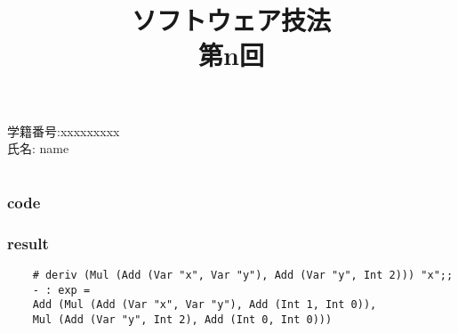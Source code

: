 

\renewcommand{\thesubsection}{\arabic{section} - (\alph{subsection})}
\renewcommand{\thesection}{課題\arabic{section}}


\lstset{language=[Objective]caml}

\makeatother
\setlength{\oddsidemargin}{-2mm}
\setlength{\evensidemargin}{-2mm}
\setlength{\topmargin}{-30mm}
\setlength{\textwidth}{164mm}
\setlength{\textheight}{250mm}

\makeatletter
\title{\rm ソフトウェア技法 \\ 第n回}
\author{}
\date{}



\maketitle

\begin{description}
	\item[\rm \large 学籍番号:xxxxxxxxx]
	\item[\rm \large 氏名: name]
\end{description}

\section{}
\subsection{}
\subsubsection*{code}
% 
\subsubsection*{result}
\begin{lstlisting}
	# deriv (Mul (Add (Var "x", Var "y"), Add (Var "y", Int 2))) "x";;
	- : exp =
	Add (Mul (Add (Var "x", Var "y"), Add (Int 1, Int 0)),
	Mul (Add (Var "y", Int 2), Add (Int 0, Int 0)))
\end{lstlisting}



